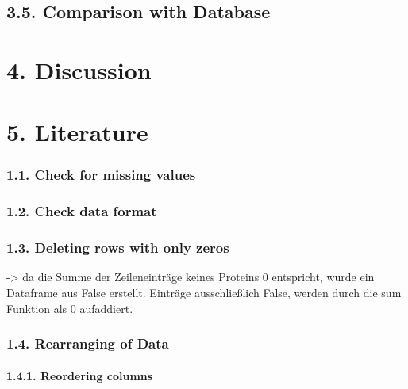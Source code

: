 \documentclass[
]{article}
\begin{document}
\hypertarget{comparison-with-database}{%
\subsection{3.5. Comparison with
Database}\label{comparison-with-database}}

\hypertarget{discussion}{%
\section{4. Discussion}\label{discussion}}

\hypertarget{literature}{%
\section{5. Literature}\label{literature}}

\hypertarget{check-for-missing-values}{%
\subsubsection{1.1. Check for missing
values}\label{check-for-missing-values}}

\hypertarget{check-data-format}{%
\subsubsection{1.2. Check data format}\label{check-data-format}}

\hypertarget{deleting-rows-with-only-zeros}{%
\subsubsection{1.3. Deleting rows with only
zeros}\label{deleting-rows-with-only-zeros}}

-\textgreater{} da die Summe der Zeileneinträge keines Proteins 0
entspricht, wurde ein Dataframe aus False erstellt. Einträge
ausschließlich False, werden durch die sum Funktion als 0 aufaddiert.

\hypertarget{rearranging-of-data}{%
\subsubsection{1.4. Rearranging of Data}\label{rearranging-of-data}}

\hypertarget{reordering-columns}{%
\paragraph{1.4.1. Reordering columns}\label{reordering-columns}}
\end{document}
